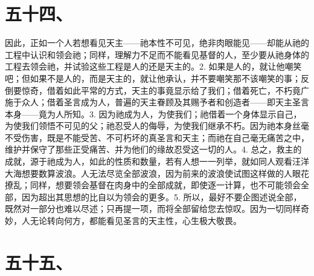 
\section{五十四、}

因此，正如一个人若想看见天主——祂本性不可见，绝非肉眼能见——却能从祂的工程中认识和领会祂；同样，理解力不足而不能看见基督的人，至少要从祂身体的工程去领会祂，并试验这些工程是人的还是天主的。\newline{}2. 如果是人的，就让他嘲笑吧；但如果不是人的，而是天主的，就让他承认，并不要嘲笑那不该嘲笑的事；反倒要惊奇，借着如此平常的方式，天主的事竟显示给了我们；借着死亡，不朽竟广施于众人；借着圣言成为人，普遍的天主眷顾及其赐予者和创造者——即天主圣言本身——竟为人所知。\newline{}3. 因为祂成为人，为使我们；祂借着一个身体显示自己，为使我们领悟不可见的父；祂忍受人的侮辱，为使我们继承不朽。因为祂本身丝毫不受伤害，既是不能受苦、不可朽坏的真圣言和天主；而祂在自己毫无痛苦之中，维护并保守了那些正受痛苦、并为他们的缘故忍受这一切的人。\newline{}4. 总之，救主的成就，源于祂成为人，如此的性质和数量，若有人想一一列举，就如同人观看汪洋大海想要数算波浪。人无法尽览全部波浪，因为前来的波浪使试图这样做的人眼花撩乱；同样，想要领会基督在肉身中的全部成就，即使逐一计算，也不可能领会全部，因为超出其思想的比自以为领会的更多。\newline{}5. 所以，最好不要企图述说全部，既然对一部分也难以尽述；只再提一项，而将全部留给您去惊叹。因为一切同样奇妙，人无论转向何方，都能看见圣言的天主性，心生极大敬畏。\par


\section{五十五、}

